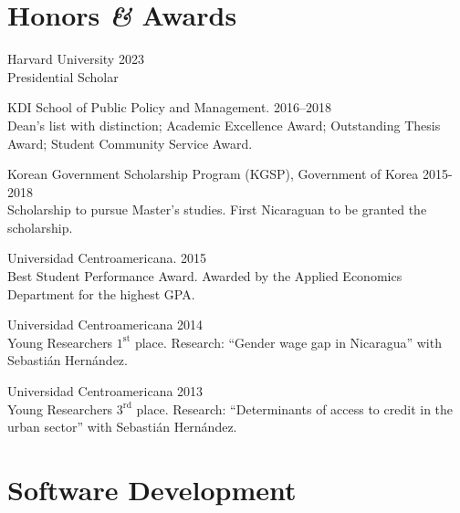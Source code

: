 \documentclass[a4paper, 10pt]{article}
\renewenvironment{itemize}{
  \begin{list}{}
    { \setlength{\itemsep}{5pt}
      \setlength{\parsep}{0pt}
      \setlength{\topsep}{0pt}
      \setlength{\leftmargin}{0em} } }{
  \end{list}}
\begin{document}

\section*{Honors \textit{\&} Awards}
\begin{itemize}
\item Harvard University \hfill 2023 \\ {\small Presidential Scholar}
\item KDI School of Public Policy and Management. \hfill 2016--2018 \\ {\small Dean's list with distinction; Academic Excellence Award; Outstanding Thesis Award; Student Community Service Award.}
\item Korean Government Scholarship Program (KGSP), Government of Korea \hfill 2015-2018 \\ {\small Scholarship to pursue Master's studies. First Nicaraguan to be granted the scholarship.}
\item Universidad Centroamericana. \hfill 2015 \\ {\small  Best Student Performance Award. Awarded by the Applied Economics Department for the highest GPA.}
\item Universidad Centroamericana \hfill 2014 \\ {\small Young Researchers $1^{\textrm{st}}$ place. Research: ``Gender wage gap in Nicaragua'' with Sebastián Hernández.}
\item Universidad Centroamericana \hfill 2013 \\ {\small Young Researchers $3^{\textrm{rd}}$ place. Research: ``Determinants of access to credit in the urban sector'' with Sebastián Hernández. }
\end{itemize}


\section*{Software Development}
\end{document}

